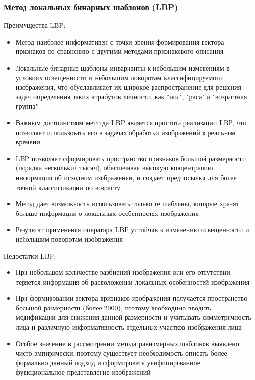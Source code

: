 \documentclass[12pt,a4paper]{article}
\begin{document}
\subsubsection{Метод локальных бинарных шаблонов (LBP)}
Преимущества LBP:
\begin{itemize}
    \item Метод наиболее информативен с точки зрения формирования вектора признаков по сравнению с другими методами признакового описания
    \item Локальные бинарные шаблоны инварианты к небольшим изменениям в условиях освещенности и небольшим поворотам классифицируемого изображения, что обуславливает их широкое распространение для решения задач определения таких атрибутов личности, как "пол", "раса" и "возрастная группа"
    \item Важным достоинством меттода LBP является простота реализации LBP, что позволяет использовать его в задачах обработки изображений в реальном времени
    \item LBP позволяет сформировать пространство признаков большой размерности (порядка нескольких тысяч), обеспечивая высокую концентрацию информации об исходном изображении, и создает предпосылки для более точной классификации по возрасту
    \item Метод дает возможность использовать только те шаблоны, которые хранят больше информации о локальных особенностях изображения
    \item Результат применения оператора LBP устойчив к изменению освещенности и небольшим поворотам изображения
\end{itemize}

Недостатки LBP:
\begin{itemize}
    \item При небольшом количестве разбиений изображения или его отсутствии теряется информация об расположении локальных особенностей изображения
    \item При формировании вектора признаков изображения получается пространство большой размерности (более 2000), поэтому необходимо вводить модификации для снижения данной размерности и учитывать симметричность лица и различную информативность отдельных участков изображения лица
    \item Особое значение в рассмотрении метода равномерных шаблонов выявлено чисто эмпирически, поэтому существует необходимость описать более формально данный подход и сформировать унифицированное функциональное представление изображений
\end{itemize}
\end{document}

